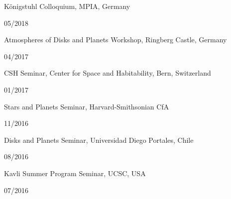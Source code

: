 \documentclass[12pt, a4paper]{article} %
\begin{document}
\begin{minipage}[t]{0.7\textwidth}
\begin{flushleft}%
  \setlength{\leftskip}{0.2cm}%
Königstuhl Colloquium, MPIA, Germany
\end{flushleft}
\end{minipage}
\begin{minipage}[t]{0.3\textwidth}
\hfill 05/2018
\end{minipage}

\begin{minipage}[t]{0.7\textwidth}
\begin{flushleft}%
  \setlength{\leftskip}{0.2cm}%
Atmospheres of Disks and Planets Workshop, Ringberg Castle, Germany
\end{flushleft}
\end{minipage}
\begin{minipage}[t]{0.3\textwidth}
\hfill 04/2017
\end{minipage}

\begin{minipage}[t]{0.7\textwidth}
\begin{flushleft}%
  \setlength{\leftskip}{0.2cm}%
CSH Seminar, Center for Space and Habitability, Bern, Switzerland
\end{flushleft}
\end{minipage}
\begin{minipage}[t]{0.3\textwidth}
\hfill 01/2017
\end{minipage}

\begin{minipage}[t]{0.7\textwidth}
\begin{flushleft}%
  \setlength{\leftskip}{0.2cm}%
Stars and Planets Seminar, Harvard-Smithsonian CfA
\end{flushleft}
\end{minipage}
\begin{minipage}[t]{0.3\textwidth}
\hfill 11/2016
\end{minipage}


\begin{minipage}[t]{0.7\textwidth}
\begin{flushleft}%
  \setlength{\leftskip}{0.2cm}%
Disks and Planets Seminar, Universidad Diego Portales, Chile
\end{flushleft}
\end{minipage}
\begin{minipage}[t]{0.3\textwidth}
\hfill 08/2016
\end{minipage}

\begin{minipage}[t]{0.7\textwidth}
\begin{flushleft}%
  \setlength{\leftskip}{0.2cm}%
Kavli Summer Program Seminar, UCSC, USA
\end{flushleft}
\end{minipage}
\begin{minipage}[t]{0.3\textwidth}
\hfill 07/2016
\end{minipage}
\end{document}
